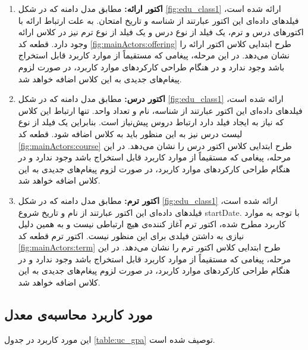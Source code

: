 \begin{enumerate}
\item\textbf{اکتور ارائه:}
مطابق مدل دامنه‌ که در شکل \ref{fig:edu_class1} ارائه شده است، فیلدهای داده‌ای این اکتور عبارتند از شناسه و تاریخ امتحان. به علت ارتباط ارائه با اکتور‌های درس و ترم، یک فیلد از نوع درس و یک فیلد از نوع ترم نیز در کلاس ارائه وجود دارد. قطعه کد \ref{fig:mainActors:offering} طرح ابتدایی کلاس اکتور ارائه را نشان می‌دهد. در این مرحله، پیغامی که مستقیماً از موارد کاربرد قابل استخراج باشد وجود ندارد
و در هنگام طراحی کارکردهای موارد کاربرد، در صورت لزوم پیغام‌های جدیدی به این کلاس اضافه خواهد شد.



\item\textbf{اکتور درس:}
مطابق مدل دامنه‌ که در شکل \ref{fig:edu_class1} ارائه شده است، فیلدهای داده‌ای این اکتور عبارتند از شناسه، نام و تعداد واحد. تنها ارتباط این کلاس که نیاز به ایجاد فیلد دارد ارتباط دروس پیش‌نیاز است. بنابراین یک فیلد از نوع لیست درس نیز به این منظور باید به کلاس اضافه شود. قطعه کد \ref{fig:mainActors:course} طرح ابتدایی کلاس اکتور درس را نشان می‌دهد. در این مرحله، پیغامی که مستقیماً از موارد کاربرد قابل استخراج باشد وجود ندارد
و در هنگام طراحی کارکردهای موارد کاربرد، در صورت لزوم پیغام‌های جدیدی به این کلاس اضافه خواهد شد.
\item\textbf{اکتور ترم:}
مطابق مدل دامنه‌ که در شکل \ref{fig:edu_class1} ارائه شده است، فیلدهای داده‌ای این اکتور عبارتند از نام و تاریخ شروع {startDate}. با توجه به موارد کاربرد مطرح شده، اکتور ترم آغاز کننده‌ی هیچ ارتباطی نیست و به همین دلیل نیازی به داشتن فیلدی برای این منظور نیست. اکتور ترم قطعه کد \ref{fig:mainActors:term} طرح ابتدایی کلاس اکتور ترم را نشان می‌دهد. در این مرحله، پیغامی که مستقیماً از موارد کاربرد قابل استخراج باشد وجود ندارد
و در هنگام طراحی کارکردهای موارد کاربرد، در صورت لزوم پیغام‌های جدیدی به این کلاس اضافه خواهد شد.
\end{enumerate}
\newpage
\subsection{مورد کاربرد محاسبه‌ی معدل}
این مورد کاربرد در جدول \ref{table:uc_gpa} توصیف شده است. 
